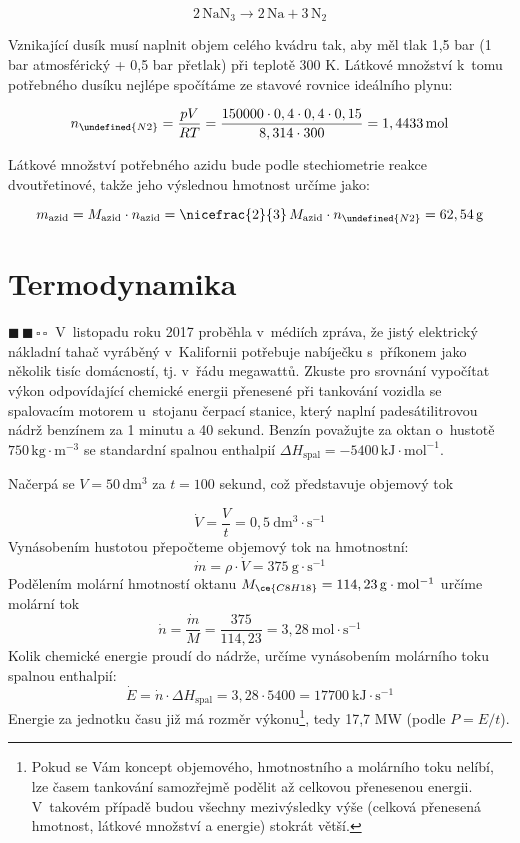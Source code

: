 \documentclass{book}
\let\ch\undefined
\newcommand{\dva}{$\blacksquare \, \blacksquare \, \square \, \square \; \; $}
\renewenvironment{quotation}{\par}{\par} %
\begin{document}
\[
\mathrm{2\,NaN_{3}\rightarrow2\,Na+3\,N_{2}}
\]

Vznikající dusík musí naplnit objem celého kvádru tak, aby měl tlak
1,5 bar (1 bar atmosférický + 0,5 bar přetlak) při teplotě 300 K.
Látkové množství k~tomu potřebného dusíku nejlépe spočítáme ze stavové
rovnice ideálního plynu:

\[
n_{\ch{N2}}=\frac{pV}{RT}=\frac{150000\cdot0,4\cdot0,4\cdot0,15}{8,314\cdot300}=1,4433\,\mathrm{mol}
\]

Látkové množství potřebného azidu bude podle stechiometrie reakce
dvoutřetinové, takže jeho výslednou hmotnost určíme jako:

\[
m_{\mathrm{azid}}=M_{\mathrm{azid}}\cdot n_{\mathrm{azid}}=\nicefrac{2}{3}\,M_{\mathrm{azid}}\cdot n_{\ch{N2}}=62,54\,\mathrm{g}
\]

\section{Termodynamika}

\begin{quotation}
\dva V~listopadu roku 2017 proběhla v~médiích zpráva, že jistý elektrický
nákladní tahač vyráběný v~Kalifornii potřebuje nabíječku s~příkonem
jako několik tisíc domácností, tj. v~řádu megawattů. Zkuste pro srovnání
vypočítat výkon odpovídající chemické energii přenesené při tankování
vozidla se spalovacím motorem u~stojanu čerpací stanice, který naplní
padesátilitrovou nádrž benzínem za 1 minutu a 40 sekund. Benzín považujte
za oktan o~hustotě $750\,\mathrm{kg\cdot m^{-3}}$ se standardní spalnou
enthalpií $\Delta\hspace{0pt}H_{\mathrm{spal}} = -5400\,\mathrm{kJ\cdot mol^{-1}}$. 
\end{quotation} \dotfill \par 
Načerpá se $V=50\,\mathrm{dm^{3}}$ za $t=100$ sekund, což představuje
objemový tok

\[
\dot{V}=\frac{V}{t}=0,5\ \mathrm{dm^{3}\cdot s^{-1}}
\]
Vynásobením hustotou přepočteme objemový tok na hmotnostní: 
\[
\dot{m}=\rho\cdot\dot{V}=375\ \mathrm{g\cdot s^{-1}}
\]
Podělením molární hmotností oktanu $M_{\ce{C8H18}}=114,23\,\mathrm{g\cdot mol^{-1}}$
určíme molární tok 
\[
\dot{n}=\frac{\dot{m}}{M}=\frac{375}{114,23}=3,28\ \mathrm{mol\cdot s^{-1}}
\]
Kolik chemické energie proudí do nádrže, určíme vynásobením molárního
toku spalnou enthalpií: 
\[
\dot{E}=\dot{n}\cdot\Delta\hspace{0pt}H_{\mathrm{spal}}=3,28\cdot5400=17700\ \mathrm{kJ\cdot s^{-1}}
\]
Energie za jednotku času již má rozměr výkonu\footnote{Pokud se Vám koncept objemového, hmotnostního a molárního toku nelíbí, lze časem tankování samozřejmě podělit až celkovou přenesenou energii. V~takovém případě budou všechny mezivýsledky výše (celková přenesená hmotnost, látkové množství a energie) stokrát větší.}, tedy 17,7 MW (podle $P=E/t$).
\end{document}
